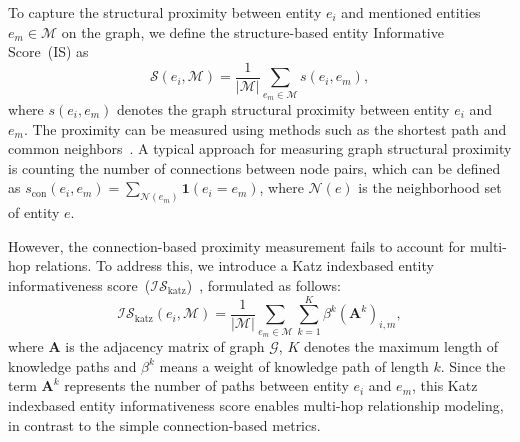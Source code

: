 To capture the structural proximity between entity $e_i$ and mentioned entities $e_m \in \mathcal{M}$ on the graph, we define the structure-based entity Informative Score~(IS) as
\begin{equation}
    \mathcal{S}(e_i, \mathcal{M}) = \frac{1}{\lvert \mathcal{M}\rvert} \sum_{e_m\in \mathcal{M}}s(e_i, e_m),
\end{equation}
where $s(e_i, e_m)$ denotes the graph structural proximity between entity $e_i$ and $e_m$.
The proximity can be measured using methods such as the shortest path and common neighbors~\cite{katz1953new,brin1998pagerank,gasteiger2018predict}.
A typical approach for measuring graph structural proximity is counting the number of connections between node pairs, which can be defined as $s_{\text{con}}(e_i, e_m) = \sum_{\mathcal{N}(e_m)} \mathbf{1}(e_i=e_m)$, where $\mathcal{N}(e)$ is the neighborhood set of entity $e$.

However, the connection-based proximity measurement fails to account for multi-hop relations.
To address this, we introduce a Katz index{\textendash}based entity informativeness score~($\mathcal{IS}_{\text{katz}}$)~\cite{katz1953new}, formulated as follows:
\begin{equation}
\label{eq:katz}
\mathcal{IS}_{\text{katz}}(e_i, \mathcal{M}) = \frac{1}{\lvert \mathcal{M}\rvert} \sum_{e_m\in \mathcal{M}}\sum_{k=1}^K \beta^k(\mathbf{A}^k)_{i,m},
\end{equation}
where $\mathbf{A}$ is the adjacency matrix of graph $\mathcal{G}$, $K$ denotes the maximum length of knowledge paths and $\beta^k$ means a weight of knowledge path of length $k$.
Since the term $\mathbf{A}^k$ represents the number of paths between entity $e_i$ and $e_m$, this Katz index{\textendash}based entity informativeness score enables multi-hop relationship modeling, in contrast to the simple connection-based metrics.